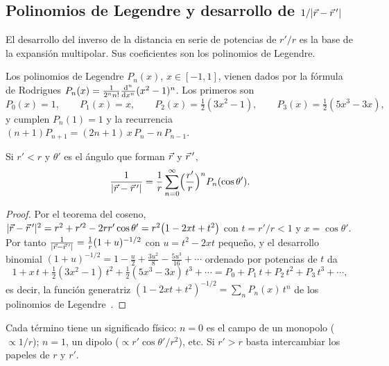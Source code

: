 \subsection{Polinomios de Legendre y desarrollo de $1/|\vec{r}-\vec{r}\,'|$}\label{sec:legendre}
El desarrollo del inverso de la distancia en serie de potencias de
$r'/r$ es la base de la expansión multipolar. Sus coeficientes son los
polinomios de Legendre.

\begin{definicion}\label{def:legendre}
Los polinomios de Legendre $P_n(x)$, $x\in[-1,1]$, vienen dados por la fórmula de
Rodrigues $P_n(x)=\frac{1}{2^{n}n!}\frac{\mathrm{d}^{n}}{\mathrm{d} x^{n}}(x^{2}-1)^{n}$. Los
primeros son
\[
  P_0(x)=1,\qquad P_1(x)=x,\qquad P_2(x)=\tfrac{1}{2}(3x^{2}-1),\qquad P_3(x)=\tfrac{1}{2}(5x^{3}-3x),
\]
y cumplen $P_n(1)=1$ y la recurrencia
$(n+1)P_{n+1}=(2n+1)\,x\,P_n-n\,P_{n-1}$.
\end{definicion}

\begin{teorema}\label{teo:legendre}
Si $r'<r$ y $\theta'$ es el ángulo que forman $\vec{r}$ y $\vec{r}\,'$,
\begin{equation}\label{eq:legendre}
  \frac{1}{\lvert \vec{r}-\vec{r}\,'\rvert}=\frac{1}{r}\sum_{n=0}^{\infty}\Bigl(\frac{r'}{r}\Bigr)^{n}P_n(\cos\theta').
\end{equation}
\end{teorema}
\begin{proof}
Por el teorema del coseno,
$\lvert \vec{r}-\vec{r}\,'\rvert^{2}=r^{2}+r'^{2}-2rr'\cos\theta'=r^{2}\bigl(1-2xt+t^{2}\bigr)$
con $t=r'/r<1$ y $x=\cos\theta'$. Por tanto
$\frac{1}{\lvert \vec{r}-\vec{r}\,'\rvert}=\frac{1}{r}(1+u)^{-1/2}$ con $u=t^{2}-2xt$ pequeño,
y el desarrollo binomial $(1+u)^{-1/2}=1-\tfrac{u}{2}+\tfrac{3u^{2}}{8}-\tfrac{5u^{3}}{16}+\cdots$
ordenado por potencias de $t$ da
\[
  1+x\,t+\tfrac{1}{2}(3x^{2}-1)\,t^{2}+\tfrac{1}{2}(5x^{3}-3x)\,t^{3}+\cdots
  =P_0+P_1\,t+P_2\,t^{2}+P_3\,t^{3}+\cdots ,
\]
es decir, la función generatriz $(1-2xt+t^{2})^{-1/2}=\sum_nP_n(x)\,t^{n}$ de los
polinomios de Legendre~\cite{ARFKEN}.
\end{proof}



Cada término tiene un significado físico: $n=0$ es el campo de un monopolo
($\propto1/r$); $n=1$, un dipolo ($\propto r'\cos\theta'/r^{2}$), etc. Si $r'>r$
basta intercambiar los papeles de $r$ y $r'$.
